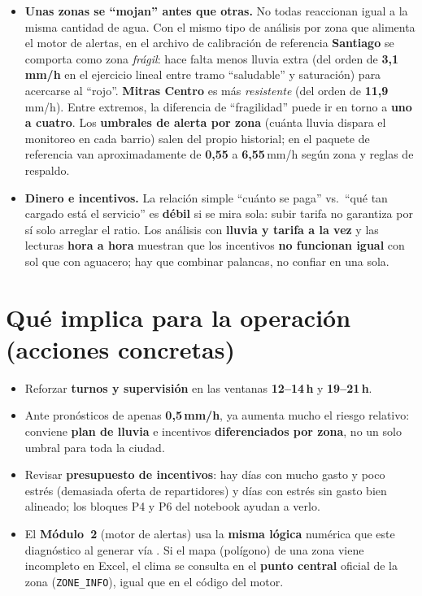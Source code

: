\documentclass[11pt,a4paper]{article}
\begin{document}
\begin{itemize}
  \item \textbf{Unas zonas se ``mojan'' antes que otras.} No todas reaccionan igual a la misma cantidad de agua. Con el mismo tipo de análisis por zona que alimenta el motor de alertas, en el archivo de calibración de referencia \textbf{Santiago} se comporta como zona \emph{frágil}: hace falta menos lluvia extra (del orden de \textbf{3{,}1\,mm/h} en el ejercicio lineal entre tramo ``saludable'' y saturación) para acercarse al ``rojo''. \textbf{Mitras Centro} es más \emph{resistente} (del orden de \textbf{11{,}9}\,mm/h). Entre extremos, la diferencia de ``fragilidad'' puede ir en torno a \textbf{uno a cuatro}. Los \textbf{umbrales de alerta por zona} (cuánta lluvia dispara el monitoreo en cada barrio) salen del propio historial; en el paquete de referencia van aproximadamente de \textbf{0{,}55} a \textbf{6{,}55}\,mm/h según zona y reglas de respaldo.

  \item \textbf{Dinero e incentivos.} La relación simple ``cuánto se paga'' vs.\ ``qué tan cargado está el servicio'' es \textbf{débil} si se mira sola: subir tarifa no garantiza por sí solo arreglar el ratio. Los análisis con \textbf{lluvia y tarifa a la vez} y las lecturas \textbf{hora a hora} muestran que los incentivos \textbf{no funcionan igual} con sol que con aguacero; hay que combinar palancas, no confiar en una sola.
\end{itemize}

\section*{Qué implica para la operación (acciones concretas)}

\begin{itemize}
  \item Reforzar \textbf{turnos y supervisión} en las ventanas \textbf{12--14\,h} y \textbf{19--21\,h}.
  \item Ante pronósticos de apenas \textbf{0{,}5\,mm/h}, ya aumenta mucho el riesgo relativo: conviene \textbf{plan de lluvia} e incentivos \textbf{diferenciados por zona}, no un solo umbral para toda la ciudad.
  \item Revisar \textbf{presupuesto de incentivos}: hay días con mucho gasto y poco estrés (demasiada oferta de repartidores) y días con estrés sin gasto bien alineado; los bloques P4 y P6 del notebook ayudan a verlo.
  \item El \textbf{Módulo~2} (motor de alertas) usa la \textbf{misma lógica} numérica que este diagnóstico al generar  vía . Si el mapa (polígono) de una zona viene incompleto en Excel, el clima se consulta en el \textbf{punto central} oficial de la zona (\texttt{ZONE\_INFO}), igual que en el código del motor.
\end{itemize}
\end{document}

